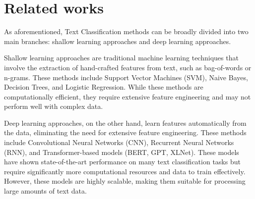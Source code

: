 \section{Related works}
As aforementioned, Text Classification methods can be broadly divided into two main branches: shallow learning approaches and deep learning approaches.

Shallow learning approaches are traditional machine learning techniques that involve the extraction of hand-crafted features from text, such as bag-of-words or n-grams. These methods include Support Vector Machines (SVM)\cite{cortesvapnik1995, boser1992}, Naive Bayes\cite{Xu2017}, Decision Trees\cite{Safavian1991}, and Logistic Regression\cite{Genkin2007, Krishnapuram2005}. While these methods are computationally efficient, they require extensive feature engineering and may not perform well with complex data.

Deep learning approaches, on the other hand, learn features automatically from the data, eliminating the need for extensive feature engineering. These methods include Convolutional Neural Networks (CNN)\cite{Kim2014}, Recurrent Neural Networks (RNN)\cite{Cho2014, Sutskever2014}, and Transformer-based models (BERT\cite{DevlinCLT19}, GPT\cite{Brown2020}, XLNet\cite{Yang2019}). These models have shown state-of-the-art performance on many text classification tasks but require significantly more computational resources and data to train effectively. However, these models are highly scalable, making them suitable for processing large amounts of text data.
